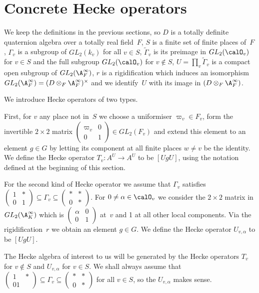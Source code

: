 \section{Concrete Hecke operators}

We keep the definitions in the previous sections, so $D$ is a totally definite
quaternion algebra over a totally real field~$F$, $S$ is a finite set of finite
places of~$F$, $\Gamma_v$ is a subgroup of $GL_2(k_v)$ for all $v\in S$,
$\tilde{\Gamma}_v$ is its preimage in $GL_2(\calO_v)$ for $v\in S$ and
the full subgroup $GL_2(\calO_v)$ for $v\notin S$, $U=\prod_v\tilde{\Gamma}_v$
is a compact open subgroup of $GL_2(\A_F^\infty)$, $r$ is a rigidification
which induces an isomorphism $GL_2(\A_F^\infty)=(D\otimes_F\A_F^\infty)^\times$
and we identify~$U$ with its image in $(D\otimes_F\A_F^\infty)$.

We introduce Hecke operators of two types.

First, for $v$ any place not in~$S$ we choose a uniformiser $\varpi_v\in F_v$,
form the invertible $2\times 2$ matrix $\begin{pmatrix}\varpi_v&0\\0&1\end{pmatrix}\in GL_2(F_v)$
and extend this element to an element $g\in G$ by letting its component at all finite places
$w\not=v$ be the identity. We define the Hecke operator $T_v:A^U\to A^U$ to be $[UgU]$, using the
notation defined at the beginning of this section.

For the second kind of Hecke operator we assume that $\Gamma_v$ satisfies
$\begin{pmatrix}1&*\\0&1\end{pmatrix}\subseteq\Gamma_v\subseteq\begin{pmatrix}*&*\\0&*\end{pmatrix}$.
For $0\not=\alpha\in\calO_v$ we consider the $2\times 2$ matrix in $GL_2(\A_K^\infty)$
which is $\begin{pmatrix}\alpha&0\\0&1\end{pmatrix}$ at~$v$ and 1 at all other local components.
Via the rigidification~$r$ we obtain an element $g\in G$.
We define the Hecke operator $U_{v,\alpha}$ to be $[UgU]$.

The Hecke algebra of interest to us will be generated by the Hecke operators $T_v$ for $v\notin S$
and $U_{v,\alpha}$ for $v\in S$. We shall always assume that
$\begin{pmatrix}1&*\\01\end{pmatrix}\subseteq\Gamma_v\subseteq\begin{pmatrix}*&*\\0&*\end{pmatrix}$
for all $v\in S$, so the $U_{v,\alpha}$ makes sense.

